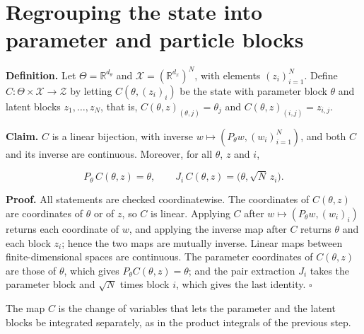 \documentclass[11pt,a4paper]{article}
\begin{document}
\section{\texorpdfstring{Regrouping the state into parameter and particle blocks}{Regrouping the state into parameter and particle blocks}}


\textbf{Definition.} Let \(\Theta=\mathbb R^{d_\theta}\) and \(\mathcal X=(\mathbb R^{d_x})^N\), with elements \((z_i)_{i=1}^N\). Define \(C:\Theta\times\mathcal X\to\mathcal Z\) by letting \(C(\theta,(z_i)_i)\) be the state with parameter block \(\theta\) and latent blocks \(z_1,\dots,z_N\), that is, \(C(\theta,z)_{(\theta,j)}=\theta_j\) and \(C(\theta,z)_{(i,j)}=z_{i,j}\).




\textbf{Claim.} \(C\) is a linear bijection, with inverse \(w\mapsto(P_\theta w,(w_i)_{i=1}^N)\), and both \(C\) and its inverse are continuous. Moreover, for all \(\theta\), \(z\) and \(i\),


\[P_\theta\,C(\theta,z)=\theta,\qquad J_i\,C(\theta,z)=\bigl(\theta,\sqrt N\,z_i\bigr).\]


\textbf{Proof.} All statements are checked coordinatewise. The coordinates of \(C(\theta,z)\) are coordinates of \(\theta\) or of \(z\), so \(C\) is linear. Applying \(C\) after \(w\mapsto(P_\theta w,(w_i)_i)\) returns each coordinate of \(w\), and applying the inverse map after \(C\) returns \(\theta\) and each block \(z_i\); hence the two maps are mutually inverse. Linear maps between finite-dimensional spaces are continuous. The parameter coordinates of \(C(\theta,z)\) are those of \(\theta\), which gives \(P_\theta C(\theta,z)=\theta\); and the pair extraction \(J_i\) takes the parameter block and \(\sqrt N\) times block \(i\), which gives the last identity. \(\square\)




The map \(C\) is the change of variables that lets the parameter and the latent blocks be integrated separately, as in the product integrals of the previous step.
\end{document}

